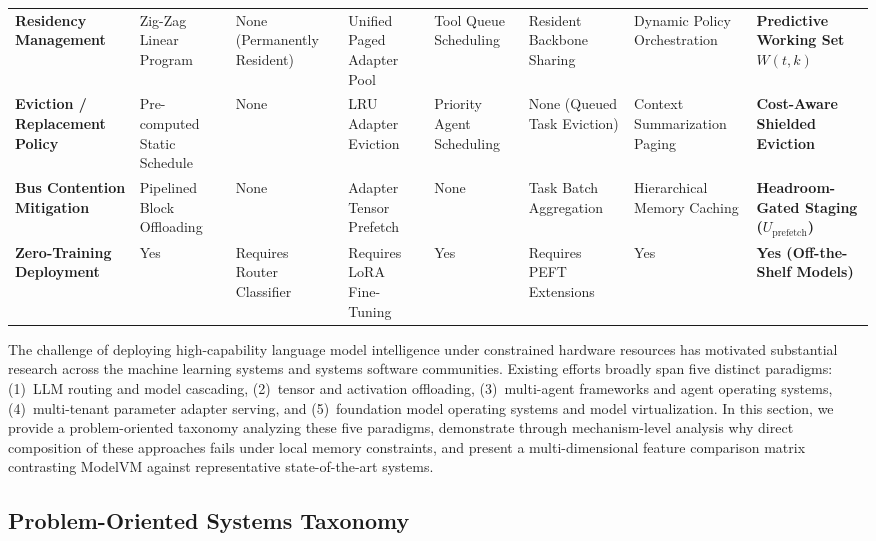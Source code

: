 \begin{table}[t]
{\begin{tabular}{>{\RaggedRight}p{2.6cm}>{\RaggedRight}p{1.9cm}>{\RaggedRight}p{2.1cm}>{\RaggedRight}p{1.9cm}>{\RaggedRight}p{1.9cm}>{\RaggedRight}p{2.0cm}>{\RaggedRight}p{1.9cm}>{\RaggedRight}p{2.3cm}}
\textbf{Residency Management} & Zig-Zag Linear Program & None (Permanently Resident) & Unified Paged Adapter Pool & Tool Queue Scheduling & Resident Backbone Sharing & Dynamic Policy Orchestration & \textbf{Predictive Working Set $W(t, k)$} \\
\textbf{Eviction / Replacement Policy} & Pre-computed Static Schedule & None & LRU Adapter Eviction & Priority Agent Scheduling & None (Queued Task Eviction) & Context Summarization Paging & \textbf{Cost-Aware Shielded Eviction} \\
\textbf{Bus Contention Mitigation} & Pipelined Block Offloading & None & Adapter Tensor Prefetch & None & Task Batch Aggregation & Hierarchical Memory Caching & \textbf{Headroom-Gated Staging ($U_{\text{prefetch}}$)} \\
\textbf{Zero-Training Deployment} & Yes & Requires Router Classifier & Requires LoRA Fine-Tuning & Yes & Requires PEFT Extensions & Yes & \textbf{Yes (Off-the-Shelf Models)} \\
\bottomrule
\end{tabular}%
}
\end{table}

The challenge of deploying high-capability language model intelligence under constrained hardware resources has motivated substantial research across the machine learning systems and systems software communities. Existing efforts broadly span five distinct paradigms: (1)~LLM routing and model cascading, (2)~tensor and activation offloading, (3)~multi-agent frameworks and agent operating systems, (4)~multi-tenant parameter adapter serving, and (5)~foundation model operating systems and model virtualization. In this section, we provide a problem-oriented taxonomy analyzing these five paradigms, demonstrate through mechanism-level analysis why direct composition of these approaches fails under local memory constraints, and present a multi-dimensional feature comparison matrix contrasting ModelVM against representative state-of-the-art systems.

\subsection{Problem-Oriented Systems Taxonomy}
\label{sec:taxonomy}

